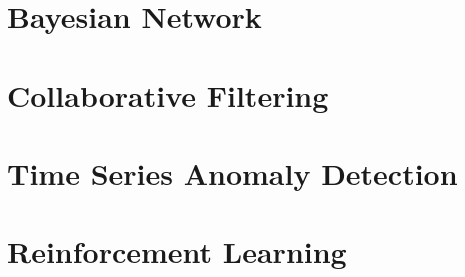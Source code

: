 \documentclass[10pt, twoside]{book}   	%
\begin{document}
\chapter{Bayesian Network}



\chapter{Collaborative Filtering}


\chapter{Time Series Anomaly Detection}


\chapter{Reinforcement Learning}



\iffalse
\appendix
\appendixpage
\addappheadtotoc


\chapter{Amazon Machine Learning University}



\fi
\end{document}
